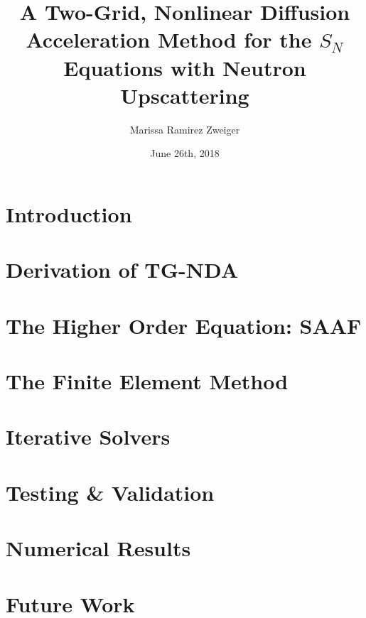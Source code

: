 \documentclass[11pt]{report}
\title{A Two-Grid, Nonlinear Diffusion Acceleration Method for the $S_N$ Equations with Neutron Upscattering}
\author{Marissa Ramirez Zweiger }
\date{June 26th, 2018}
\begin{document}
\maketitle

\tableofcontents

\chapter{Introduction}
\label{sec:intro}


\chapter{Derivation of TG-NDA}
\label{sec:derivation}


\chapter{The Higher Order Equation: SAAF}
\label{sec:ho}


\chapter{The Finite Element Method}
\label{sec:spatial}


\chapter{Iterative Solvers}
\label{sec:iterative}


\chapter{Testing \& Validation}
\label{sec:testing}


\chapter{Numerical Results}
\label{sec:results}


\chapter{Future Work}
\label{sec:future}




\end{document}
